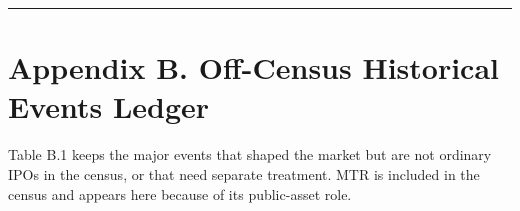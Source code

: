 \documentclass[11pt,letterpaper]{article}
\begin{document}
\par\medskip\noindent\rule{\linewidth}{0.35pt}\par\medskip
\section*{\texorpdfstring{Appendix B. Off-Census Historical Events Ledger}{Appendix B. Off-Census Historical Events Ledger}}
Table B.1 keeps the major events that shaped the market but are not ordinary IPOs in the census, or that need separate treatment. MTR is included in the census and appears here because of its public-asset role.
\end{document}
